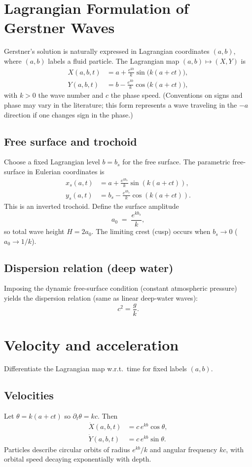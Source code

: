 \documentclass[11pt,letterpaper]{article}
\begin{document}
\section{Lagrangian Formulation of Gerstner Waves}
Gerstner’s solution is naturally expressed in Lagrangian coordinates $(a,b)$, where $(a,b)$ labels a fluid particle. The Lagrangian map $(a,b)\mapsto (X,Y)$ is
\begin{align}
X(a,b,t) &= a + \frac{e^{k b}}{k}\sin\big(k(a+ct)\big), \label{eq:gerstnerX}\\
Y(a,b,t) &= b - \frac{e^{k b}}{k}\cos\big(k(a+ct)\big), \label{eq:gerstnerY}
\end{align}
with $k>0$ the wave number and $c$ the phase speed. (Conventions on signs and phase may vary in the literature; this form represents a wave traveling in the $-a$ direction if one changes sign in the phase.)

\subsection{Free surface and trochoid}
Choose a fixed Lagrangian level $b=b_s$ for the free surface. The parametric free-surface in Eulerian coordinates is
\begin{align}
x_s(a,t) &= a + \frac{e^{kb_s}}{k}\sin(k(a+ct)), \\
y_s(a,t) &= b_s - \frac{e^{kb_s}}{k}\cos(k(a+ct)).
\end{align}
This is an inverted trochoid. Define the surface amplitude
\[
a_0 \;=\; \frac{e^{kb_s}}{k},
\]
so total wave height $H=2a_0$. The limiting crest (cusp) occurs when $b_s\to 0$ ($a_0\to 1/k$).

\subsection{Dispersion relation (deep water)}
Imposing the dynamic free-surface condition (constant atmospheric pressure) yields the dispersion relation (same as linear deep-water waves):
\begin{equation}
c^2 = \frac{g}{k}. \label{eq:dispersion}
\end{equation}

\section{Velocity and acceleration}
Differentiate the Lagrangian map w.r.t.\ time for fixed labels $(a,b)$.

\subsection{Velocities}
Let $\theta=k(a+ct)$ so $\partial_t\theta = kc$. Then
\begin{align}
\dot X(a,b,t) &= c\,e^{k b}\cos\theta, \label{eq:velX}\\
\dot Y(a,b,t) &= c\,e^{k b}\sin\theta. \label{eq:velY}
\end{align}
Particles describe circular orbits of radius $e^{kb}/k$ and angular frequency $kc$, with orbital speed decaying exponentially with depth.
\end{document}

